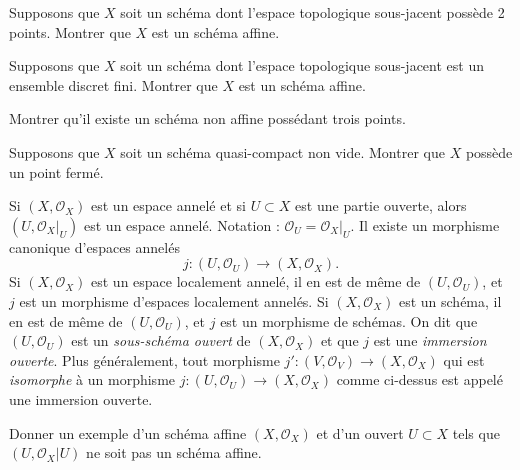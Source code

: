 \begin{exercise}
\label{exercise-two-points}
Supposons que $X$ soit un schéma dont l'espace topologique
sous-jacent possède 2 points. Montrer que $X$ est un schéma affine.
\end{exercise}

\begin{exercise}
\label{exercise-discrete-finite-set-points}
Supposons que $X$ soit un schéma dont l'espace topologique sous-jacent est un
ensemble discret fini. Montrer que $X$ est un schéma affine.
\end{exercise}

\begin{exercise}
\label{exercise-three-points}
Montrer qu'il existe un schéma non affine possédant trois points.
\end{exercise}

\begin{exercise}
\label{exercise-quasi-compact-closed-point}
Supposons que $X$ soit un schéma quasi-compact non vide.
Montrer que $X$ possède un point fermé.
\end{exercise}

\begin{remark}
\label{remark-open-immersion}
Si $(X, {\mathcal O}_X)$ est un espace annelé et si $U \subset X$
est une partie ouverte, alors $(U, {\mathcal O}_X|_U)$ est un espace annelé. Notation :
${\mathcal O}_U = {\mathcal O}_X|_U$. Il existe un morphisme canonique
d'espaces annelés
$$
j : (U, {\mathcal O}_U) \longrightarrow (X, {\mathcal O}_X).
$$
Si $(X, {\mathcal O}_X)$ est un espace localement annelé, il en est de même de
$(U, {\mathcal O}_U)$, et
$j$ est un morphisme d'espaces localement annelés. Si $(X, {\mathcal O}_X)$
est un schéma,
il en est de même de $(U, {\mathcal O}_U)$, et $j$ est un morphisme de schémas. On dit
que
$(U, {\mathcal O}_U)$ est un {\it sous-schéma ouvert} de $(X, {\mathcal O}_X)$
et que
$j$ est une {\it immersion ouverte}. Plus généralement, tout morphisme
$j' : (V, {\mathcal O}_V) \to (X, {\mathcal O}_X)$ qui est {\it isomorphe}
à un
morphisme $j : (U, {\mathcal O}_U) \to (X, {\mathcal O}_X)$ comme ci-dessus est
appelé une
immersion ouverte.
\end{remark}

\begin{exercise}
\label{exercise-open-affine-not-affine}
Donner un exemple d'un schéma affine $(X, {\mathcal O}_X)$
et d'un ouvert $U \subset X$ tels que $(U, {\mathcal O}_X|U)$ ne soit pas un
schéma affine.
\end{exercise}

